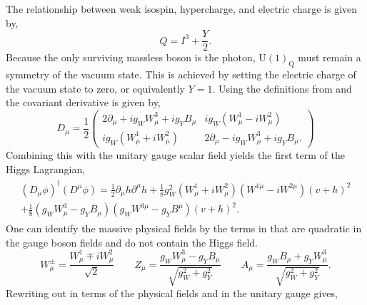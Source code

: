 The relationship between weak isospin, hypercharge, and electric charge is given by,
\begin{equation}
	\label{eq:hypercharge}
	Q = I^3 + \frac{Y}{2}.
\end{equation}
Because the only surviving massless boson is the photon, $\text{U}(1)_\text{Q}$ must remain a symmetry of the vacuum state.
This is achieved by setting the electric charge of the vacuum state to zero, or equivalently $Y=1$.
Using the definitions from  and  the covariant derivative is given by,
\begin{equation}
	\label{eq:higgs_covariant_derivative}
	D_\mu = \frac{1}{2}
	\begin{pmatrix}
		2 \partial_\mu + i g_W W_\mu^3 + i g_Y B_\mu &
		i g_W (W_\mu^1 - i W_\mu^2)                    \\
		i g_W (W_\mu^1 + i W_\mu^2)                  &
		2 \partial_\mu - i g_W W_\mu^3 + i g_Y B_\mu.
	\end{pmatrix}
\end{equation}
Combining this with the unitary gauge scalar field yields the first term of the Higgs Lagrangian,
\begin{align}
	\label{eq:higgs_lagrangian_1}
	\begin{split}
		(D_\mu \phi)^\dagger (D^\mu \phi) =
		\frac{1}{2} \partial_\mu h \partial^\mu h
		+ \frac{1}{8} g_W^2 (W_\mu^1 + i W_\mu^2)(W^{1\mu} - i W^{2\mu})(v + h)^2
		\\
		+ \frac{1}{8} (g_W W_\mu^3 - g_Y B_\mu)(g_W W^{3\mu} - g_Y B^\mu)(v + h)^2.
	\end{split}
\end{align}
One can identify the massive physical fields by the terms in  that are quadratic in the gauge boson fields and do not contain the Higgs field.
\begin{equation}
	W^\pm_\mu = \frac{W^1_\mu \mp i W^2_\mu}{\sqrt{2}}
	\qquad
	Z_\mu = \frac{g_W W^3_\mu - g_Y B_\mu}{\sqrt{g_W^2 + g_Y^2}}
	\qquad
	A_\mu = \frac{g_W B_\mu + g_Y W^3_\mu}{\sqrt{g_W^2 + g_Y^2}}.
\end{equation}
Rewriting out  in terms of the physical fields and in the unitary gauge gives,
